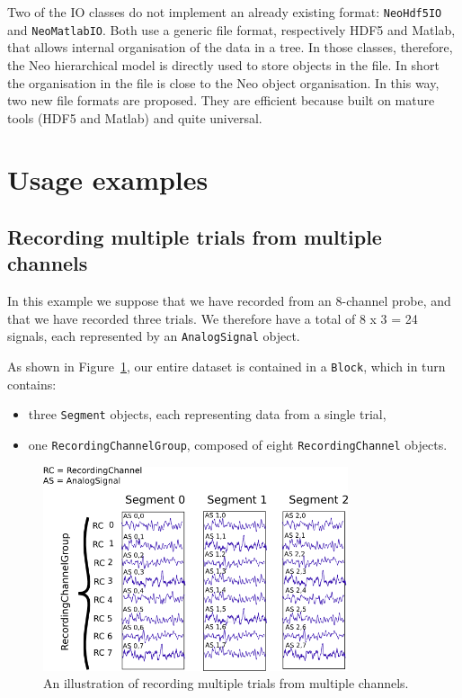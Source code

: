 \documentclass{frontiers}
\begin{document}
Two of the IO classes do not implement an already existing format: \lstinline`NeoHdf5IO` and \lstinline`NeoMatlabIO`. Both use a generic file format, respectively HDF5 and Matlab, that allows internal organisation of the data in a tree. In those classes, therefore, the Neo hierarchical model is directly used to store objects in the file. In short the organisation in the file is close to the Neo object organisation. In this way, two new file formats are proposed. They are efficient because built on mature tools (HDF5 and Matlab) and quite universal.



\section{Usage examples}

\subsection{Recording multiple trials from multiple channels}


In this example we suppose that we have recorded from an 8-channel probe, and that we have recorded three trials. We therefore have a total of 8 x 3 = 24 signals, each represented by an \lstinline`AnalogSignal` object.

As shown in Figure~\ref{fig:usecase1}, our entire dataset is contained in a \lstinline`Block`, which in turn contains:
\begin{itemize}
\item three \lstinline`Segment` objects, each representing data from a single trial,
\item one \lstinline`RecordingChannelGroup`, composed of eight \lstinline`RecordingChannel` objects.
\end{itemize}

\begin{figure}
\centering
\includegraphics[width=0.8\textwidth]{figures/usecase1}
\caption{An illustration of recording multiple trials from multiple channels.}\label{fig:usecase1} 
\end{figure}
\end{document}
